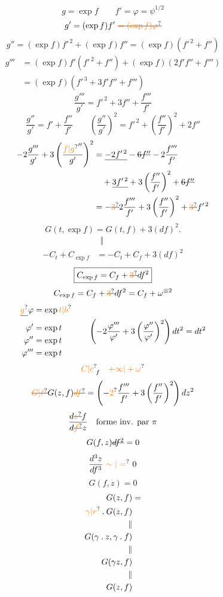 \[
g=\exp f\qquad f'=\varphi=\psi^{1/2}
\]
\[
g'=(\exp f)f'\ \deleted{\unsure{=(\exp f)\varphi}}
\]
\[
g''=(\exp f)f'^{\,2}+(\exp f)f''=(\exp f)(f'^{\,2}+f'')
\]
\[
\begin{aligned}
g'''&=(\exp f)f'(f'^{\,2}+f'')+(\exp f)(2f'f''+f''')\\
&=(\exp f)(f'^{\,3}+3f'f''+f''')
\end{aligned}
\]
\[
\frac{g'''}{g'}=f'^{\,2}+3f''+\frac{f'''}{f'}
\]
\[
\frac{g''}{g'}=f'+\frac{f''}{f'}\qquad
\left(\frac{g''}{g'}\right)^2=f'^{\,2}+\left(\frac{f''}{f'}\right)^2+2f''
\]
\[
\begin{aligned}
-2\frac{g'''}{g'}+3\left(\frac{\unsure{f|g}''}{g'}\right)^2
&=\underline{-2f'^{\,2}}-\deleted{6f''}-2\frac{f'''}{f'}\\
&\quad+\underline{3f'^{\,2}}+3\left(\frac{f''}{f'}\right)^2+\deleted{6f''}\\
&=-\deleted{\unsure{3}}2\frac{f'''}{f'}+3\left(\frac{f''}{f'}\right)^2+\deleted{\unsure{3}}f'^{\,2}
\end{aligned}
\]
\[
G(t,\exp f)=G(t,f)+3(df)^2.
\]
\[
\begin{aligned}
&\ \ \Vert\\[-2pt]
-C_t+C_{\exp f}&=-C_t+C_f+3(df)^2
\end{aligned}
\]
\[
\boxed{C_{\exp f}=C_f+\deleted{\unsure{3}}df^2}
\]
\[
C_{\exp f}=C_f+\deleted{\unsure{3}}df^2=C_f+\omega^{\otimes 2}
\]
\[
\begin{aligned}
\deleted{\unsure{g}}\varphi&=\exp \unsure{t|b}\\
\varphi'&=\exp t\\
\varphi''&=\exp t\\
\varphi'''&=\exp t
\end{aligned}
\qquad
\left(-2\frac{\varphi'''}{\varphi'}+3\left(\frac{\varphi''}{\varphi'}\right)^2\right)dt^2=dt^2
\]
\[
\unsure{C|c}_{\!f}\quad \unsure{+\infty|+\omega}
\]
\[
\deleted{\unsure{G|\ell}}G(z,f)\deleted{\unsure{df}}=
\left(-\unsure{2}\frac{f'''}{f'}+3\left(\frac{f''}{f'}\right)^2\right)dz^2
\]
\[
\frac{d\deleted{\unsure{z}}f}{d\deleted{\unsure{f}}z}\quad \text{forme inv. par }\pi
\]
\[
G(f,z)\deleted{df^2}=0
\]
\[
\frac{d^3z}{df^3}\ \unsure{\sim|=}\ 0
\]
\[
G(f,z)=0
\]
\[
\begin{aligned}
G(z,f)&=\\
\unsure{\gamma|r}\mathbin{.}G(z,f)&\\
\Vert&\\
G(\gamma\mathbin{.}z,\gamma\mathbin{.}f)&\\
\Vert&\\
G(\gamma z,f)&\\
\Vert&\\
G(z,f)&
\end{aligned}
\]

